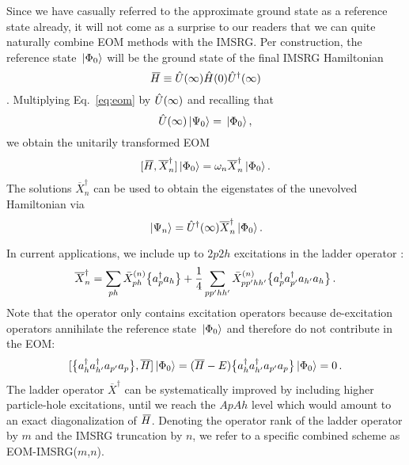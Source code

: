 Since we have casually referred to the approximate ground state as a 
reference state already, it will not come as a surprise to our readers
that we can quite naturally combine EOM methods with the IMSRG. Per construction,
the reference state $\,|{\Phi_0}\rangle$ will be the ground state of the final IMSRG Hamiltonian 
\begin{equation}
  \mkern 3mu\overline{\mkern-3muH}\equiv\hat{U}(\infty)\hat{H}(0)\hat{U}^\dag(\infty)
\end{equation}. Multiplying Eq.~\ref{eq:eom} by $\hat{U}(\infty)$ and recalling that 
\begin{equation}
  \hat{U}(\infty)\,|{\Psi_0}\rangle = \,|{\Phi_0}\rangle\,,
\end{equation}
we obtain the unitarily transformed EOM
\begin{equation}\label{eq:eom}
  \comm{\Hfinal}{\overline{X}^\dag_n}\ket{\Phi_0} = \omega_n \overline{X}^\dag_n\ket{\Phi_0}\,.
\end{equation}
The solutions $\overline{X}^\dag_n$ can be used to obtain the eigenstates 
of the unevolved Hamiltonian via
\begin{equation}
  \,|{\Psi_n}\rangle = \hat{U}^\dag(\infty)\overline{X}^\dag_n\,|{\Phi_0}\rangle\,.
\end{equation}

In current applications, we include up to $2p2h$ excitations in the ladder 
operator \cite{Parzuchowski:2016pi}:
\begin{equation}\label{eq:eom_imsrg}
  \overline{X}^\dagger_n = \sum_{ph} \bar{X}^{(n)}_{ph} \nord{\aaO_{p}\aO_{h}} + \frac{1}{4}\sum_{pp'hh'} \bar{X}^{(n)}_{pp'hh'} \nord{\aaO_{p}\aaO_{p'}\aO_{h'}\aO_{h}} \,.
\end{equation}
Note that the operator only contains excitation operators because de-excitation 
operators annihilate the reference state $\,|{\Phi_0}\rangle$ and therefore do not 
contribute in the EOM:
\begin{equation}
   [{\big\{a^\dag_{h}a^\dag_{h'}a_{p'}a_{p}\big\}},{\overline{H}}]\,|{\Phi_0}\rangle
   = (\overline{H} - E)\big\{a^\dag_{h}a^\dag_{h'}a_{p'}a_{p}\big\}\,|{\Phi_0}\rangle = 0\,.
\end{equation}
The ladder operator $\overline{X}^\dag$ can be systematically improved by including higher
particle-hole excitations, until we reach the $ApAh$ level which would amount 
to an exact diagonalization of $\mkern 3mu\overline{\mkern-3muH}$. Denoting the operator rank of the 
ladder operator by $m$ and the IMSRG truncation by $n$, we refer to a specific
combined scheme as EOM-IMSRG($m$,$n$). 

